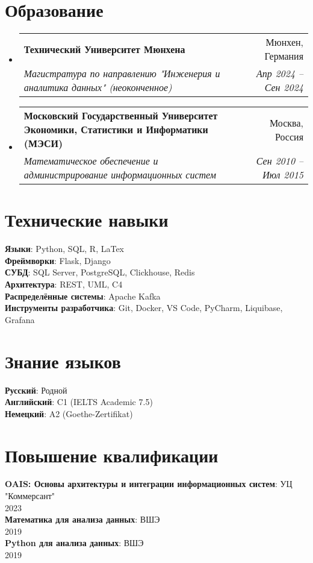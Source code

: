 \documentclass[letterpaper,11pt,english,russian]{article}
\newcommand{\resumeSubheading}[4]{
  \vspace{-2pt}\item
    \begin{tabularx}{0.95\textwidth}[t]{X r}
      \textbf{#1} & #2 \\
      \textit{\small #3} & \textit{\small #4} \\
    \end{tabularx}\vspace{-7pt}
}
\newcommand{\resumeSubHeadingListStart}{\begin{itemize}[leftmargin=0.15in, label={}]}
\newcommand{\resumeSubHeadingListEnd}{\end{itemize}}
\begin{document}
\section{Образование}
  \resumeSubHeadingListStart
    \resumeSubheading
      {Технический Университет Мюнхена}{Мюнхен, Германия}
      {Магистратура по направлению "Инженерия и аналитика данных" (неоконченное)}{Апр 2024 -- Сен 2024}
    \resumeSubheading
      {Московский Государственный Университет Экономики, Статистики и Информатики (МЭСИ)}{Москва, Россия}
      {Математическое обеспечение и администрирование информационных систем}{Сен 2010 -- Июл 2015}
  \resumeSubHeadingListEnd


%
\section{Технические навыки}
 \begin{itemize}[leftmargin=0.15in, label={}]
    \small{\item{
     \textbf{Языки}{: Python, SQL, R, LaTex} \\
     \textbf{Фреймворки}{: Flask, Django} \\
     \textbf{СУБД}{: SQL Server, PostgreSQL, Clickhouse, Redis} \\
     \textbf{Архитектура}{: REST, UML, C4}\\
     \textbf{Распределённые системы}{: Apache Kafka} \\
     \textbf{Инструменты разработчика}{: Git, Docker, VS Code, PyCharm, Liquibase, Grafana}
    }}
 \end{itemize}

%
\section{Знание языков}
 \begin{itemize}[leftmargin=0.15in, label={}]
    \small{\item{
     \textbf{Русский}{: Родной} \\
     \textbf{Английский}{: C1 (IELTS Academic 7.5)} \\
     \textbf{Немецкий}{: A2 (Goethe-Zertifikat)}
    }}
 \end{itemize}

\section{Повышение квалификации}
 \begin{itemize}[leftmargin=0.15in, label={}]
    \small{\item{
     \textbf{OAIS: Основы архитектуры и интеграции информационных систем}{: УЦ "Коммерсант"\\ 2023} \\
     \textbf{Математика для анализа данных}{: ВШЭ\\ 2019} \\
     \textbf{Python для анализа данных}{: ВШЭ\\ 2019}
    }}
 \end{itemize}


\end{document}
